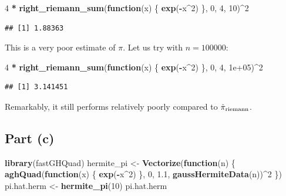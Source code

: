 \documentclass[
  12pt,
]{paper}
\newenvironment{Shaded}{\begin{snugshade}}{\end{snugshade}}
\newcommand{\ControlFlowTok}[1]{\textcolor[rgb]{0.13,0.29,0.53}{\textbf{#1}}}
\newcommand{\DecValTok}[1]{\textcolor[rgb]{0.00,0.00,0.81}{#1}}
\newcommand{\FloatTok}[1]{\textcolor[rgb]{0.00,0.00,0.81}{#1}}
\newcommand{\FunctionTok}[1]{\textcolor[rgb]{0.13,0.29,0.53}{\textbf{#1}}}
\newcommand{\NormalTok}[1]{#1}
\newcommand{\OtherTok}[1]{\textcolor[rgb]{0.56,0.35,0.01}{#1}}
\newcommand{\SpecialCharTok}[1]{\textcolor[rgb]{0.81,0.36,0.00}{\textbf{#1}}}
\begin{document}
\begin{Shaded}
\begin{Highlighting}[]
\DecValTok{4} \SpecialCharTok{*} \FunctionTok{right\_riemann\_sum}\NormalTok{(}\ControlFlowTok{function}\NormalTok{(x) \{}
    \FunctionTok{exp}\NormalTok{(}\SpecialCharTok{{-}}\NormalTok{x}\SpecialCharTok{\^{}}\DecValTok{2}\NormalTok{)}
\NormalTok{\}, }\DecValTok{0}\NormalTok{, }\DecValTok{4}\NormalTok{, }\DecValTok{10}\NormalTok{)}\SpecialCharTok{\^{}}\DecValTok{2}
\end{Highlighting}
\end{Shaded}

\begin{verbatim}
## [1] 1.88363
\end{verbatim}

This is a very poor estimate of \(\pi\). Let us try with \(n=100000\):

\begin{Shaded}
\begin{Highlighting}[]
\DecValTok{4} \SpecialCharTok{*} \FunctionTok{right\_riemann\_sum}\NormalTok{(}\ControlFlowTok{function}\NormalTok{(x) \{}
    \FunctionTok{exp}\NormalTok{(}\SpecialCharTok{{-}}\NormalTok{x}\SpecialCharTok{\^{}}\DecValTok{2}\NormalTok{)}
\NormalTok{\}, }\DecValTok{0}\NormalTok{, }\DecValTok{4}\NormalTok{, }\FloatTok{1e+05}\NormalTok{)}\SpecialCharTok{\^{}}\DecValTok{2}
\end{Highlighting}
\end{Shaded}

\begin{verbatim}
## [1] 3.141451
\end{verbatim}

Remarkably, it still performs relatively poorly compared to
\(\hat{\pi}_{\rm{riemann}}\).

\hypertarget{part-c}{%
\subsection{Part (c)}\label{part-c}}


\begin{Shaded}
\begin{Highlighting}[]
\FunctionTok{library}\NormalTok{(fastGHQuad)}
\NormalTok{hermite\_pi }\OtherTok{\textless{}{-}} \FunctionTok{Vectorize}\NormalTok{(}\ControlFlowTok{function}\NormalTok{(n) \{}
    \FunctionTok{aghQuad}\NormalTok{(}\ControlFlowTok{function}\NormalTok{(x) \{}
        \FunctionTok{exp}\NormalTok{(}\SpecialCharTok{{-}}\NormalTok{x}\SpecialCharTok{\^{}}\DecValTok{2}\NormalTok{)}
\NormalTok{    \}, }\DecValTok{0}\NormalTok{, }\FloatTok{1.1}\NormalTok{, }\FunctionTok{gaussHermiteData}\NormalTok{(n))}\SpecialCharTok{\^{}}\DecValTok{2}
\NormalTok{\})}
\NormalTok{pi.hat.herm }\OtherTok{\textless{}{-}} \FunctionTok{hermite\_pi}\NormalTok{(}\DecValTok{10}\NormalTok{)}
\NormalTok{pi.hat.herm}
\end{Highlighting}
\end{Shaded}
\end{document}
